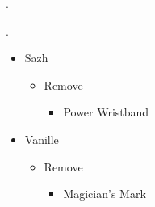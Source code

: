 \begin{paracol}{2}


	.

	.
	\switchcolumn
	\begin{menu}
		\begin{itemize}
			\equip
			\begin{itemize}
				\item Sazh
				      \begin{itemize}
					      \item Remove
					            \begin{itemize}
						            \item Power Wristband
					            \end{itemize}
				      \end{itemize}
				\item Vanille
				      \begin{itemize}
					      \item Remove
					            \begin{itemize}
						            \item Magician's Mark
					            \end{itemize}
				      \end{itemize}
			\end{itemize}
		\end{itemize}
	\end{menu}





\end{paracol}
